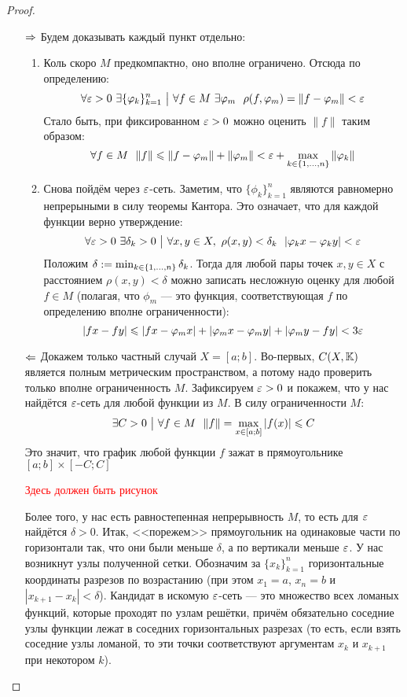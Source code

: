 \begin{proof}~
	\begin{itemize}
		\item[$\Rightarrow$] Будем доказывать каждый пункт отдельно:
		\begin{enumerate}
			\item Коль скоро $M$ предкомпактно, оно вполне ограничено. Отсюда по определению:
			\[
				\forall \varepsilon > 0\ \exists \{\varphi_k\}_{k = 1}^n \ \big|\  \forall f \in M\ \exists \varphi_m\ \ \rho(f, \varphi_m) = \|f - \varphi_m\| < \varepsilon
			\]
			Стало быть, при фиксированном $\varepsilon > 0$ можно оценить $\|f\|$ таким образом:
			\[
				\forall f \in M\ \ \|f\| \leqslant \|f - \varphi_m\| + \|\varphi_m\| < \varepsilon + \max_{k \in \{1, \ldots, n\}} \|\varphi_k\|
			\]
			
			\item Снова пойдём через $\varepsilon$-сеть. Заметим, что $\{\phi_k\}_{k = 1}^n$ являются равномерно непрерыными в силу теоремы Кантора. Это означает, что для каждой функции верно утверждение:
			\[
				\forall \varepsilon > 0\ \exists \delta_k > 0 \ \big|\  \forall x, y \in X,\ \rho(x, y) < \delta_k\ \ |\varphi_kx - \varphi_ky| < \varepsilon
			\]
			Положим $\delta := \min_{k \in \{1, \ldots, n\}} \delta_k$. Тогда для любой пары точек $x, y \in X$ с расстоянием $\rho(x, y) < \delta$ можно записать несложную оценку для любой $f \in M$ (полагая, что $\phi_m$ --- это функция, соответствующая $f$ по определению вполне ограниченности):
			\[
				|fx - fy| \leqslant |fx - \varphi_m x| + |\varphi_m x - \varphi_m y| + |\varphi_m y - fy| < 3\varepsilon
			\]
		\end{enumerate}
		
		\item[$\Leftarrow$] Докажем только частный случай $X = [a; b]$. Во-первых, $C(X, \mathbb{K})$ является полным метрическим пространством, а потому надо проверить только вполне ограниченность $M$. Зафиксируем $\varepsilon > 0$ и покажем, что у нас найдётся $\varepsilon$-сеть для любой функции из $M$. В силу ограниченности $M$:
		\[
			\exists C > 0 \such \forall f \in M\ \ \|f\| = \max_{x \in [a; b]} |f(x)| \le C
		\]
		Это значит, что график любой функции $f$ зажат в прямоугольнике $[a; b] \times [-C; C]$
		
		\textcolor{red}{Здесь должен быть рисунок}
		
		Более того, у нас есть равностепенная непрерывность $M$, то есть для $\varepsilon$ найдётся $\delta > 0$. Итак, <<порежем>> прямоугольник на одинаковые части по горизонтали так, что они были меньше $\delta$, а по вертикали меньше $\varepsilon$. У нас возникнут узлы полученной сетки. Обозначим за $\{x_k\}_{k = 1}^n$ горизонтальные координаты разрезов по возрастанию (при этом $x_1 = a$, $x_n = b$ и $|x_{k + 1} - x_k| < \delta$). Кандидат в искомую $\varepsilon$-сеть --- это множество всех ломаных функций, которые проходят по узлам решётки, причём обязательно соседние узлы функции лежат в соседних горизонтальных разрезах (то есть, если взять соседние узлы ломаной, то эти точки соответствуют аргументам $x_k$ и $x_{k + 1}$ при некотором $k$).
		

\end{itemize}
\end{proof}
